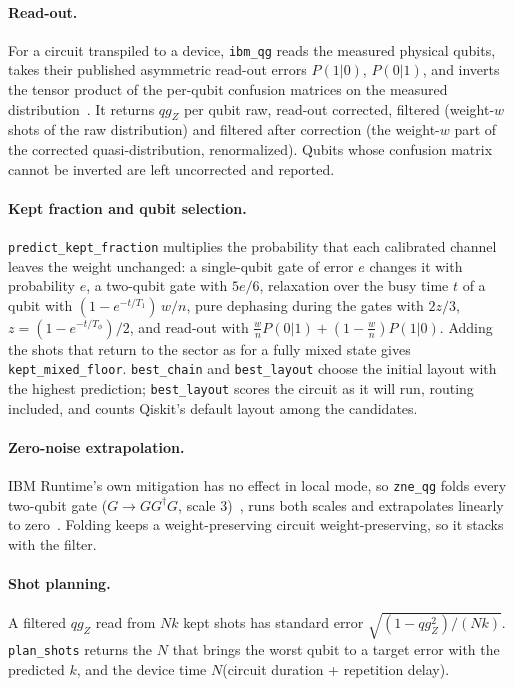 \documentclass[11pt]{article}
\newcommand{\qZ}{qg_Z}
\begin{document}
\paragraph{Read-out.} For a circuit transpiled to a device, \texttt{ibm\_qg} reads the measured physical
qubits, takes their published asymmetric read-out errors $P(1|0)$, $P(0|1)$, and inverts the tensor product
of the per-qubit confusion matrices on the measured distribution~\cite{bravyi2021readout}. It returns
$\qZ$ per qubit raw, read-out corrected, filtered (weight-$w$ shots of the raw distribution) and filtered
after correction (the weight-$w$ part of the corrected quasi-distribution, renormalized). Qubits whose
confusion matrix cannot be inverted are left uncorrected and reported.

\paragraph{Kept fraction and qubit selection.} \texttt{predict\_kept\_fraction} multiplies the probability
that each calibrated channel leaves the weight unchanged: a single-qubit gate of error $e$ changes it with
probability $e$, a two-qubit gate with $5e/6$, relaxation over the busy time $t$ of a qubit with
$(1-e^{-t/T_1})\,w/n$, pure dephasing during the gates with $2z/3$, $z=(1-e^{-t/T_\phi})/2$, and read-out
with $\tfrac{w}{n}P(0|1)+(1-\tfrac{w}{n})P(1|0)$. Adding the shots that return to the sector as for a fully
mixed state gives \texttt{kept\_mixed\_floor}. \texttt{best\_chain} and \texttt{best\_layout} choose the
initial layout with the highest prediction; \texttt{best\_layout} scores the circuit as it will run, routing
included, and counts Qiskit's default layout among the candidates.

\paragraph{Zero-noise extrapolation.} IBM Runtime's own mitigation has no effect in local mode, so
\texttt{zne\_qg} folds every two-qubit gate ($G\to GG^\dagger G$, scale 3)~\cite{giurgicatiron2020}, runs
both scales and extrapolates linearly to zero~\cite{temme2017}. Folding keeps a weight-preserving circuit
weight-preserving, so it stacks with the filter.

\paragraph{Shot planning.} A filtered $\qZ$ read from $Nk$ kept shots has standard error
$\sqrt{(1-\qZ^2)/(Nk)}$. \texttt{plan\_shots} returns the $N$ that brings the worst qubit to a target error
with the predicted $k$, and the device time $N$(circuit duration + repetition delay).
\end{document}

